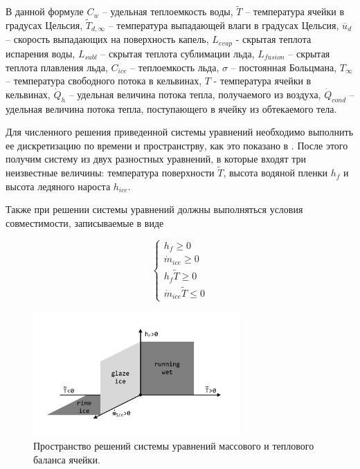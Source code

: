 \documentclass[
11pt,%
tightenlines,%
twoside,%
onecolumn,%
nofloats,%
nobibnotes,%
nofootinbib,%
superscriptaddress,%
noshowpacs,%
centertags]%
{revtex4}
\begin{document}
В данной формуле $C_w$ -- удельная теплоемкость воды, $\tilde{T}$ -- температура ячейки в градусах Цельсия, $\tilde{T}_{d,\infty}$ -- температура выпадающей влаги в градусах Цельсия, $\overline{u}_d$ -- скорость выпадающих на поверхность капель, $L_{evap}$ - скрытая теплота испарения воды, $L_{subl}$ -- скрытая теплота сублимации льда, $L_{fusion}$ -- скрытая теплота плавления льда, $C_{ice}$ -- теплоемкость льда, $\sigma$ -- постоянная Больцмана, $T_{\infty}$ -- температура свободного потока в кельвинах, $T$ - температура ячейки в кельвинах, $\dot Q_h$ -- удельная величина потока тепла, получаемого из воздуха, $\dot Q_{cond}$ -- удельная величина потока тепла, поступающего в ячейку из обтекаемого тела.

Для численного решения приведенной системы уравнений необходимо выполнить ее дискретизацию по времени и пространстрву, как это показано в \cite{Beaugendre}.
После этого получим систему из двух разностных уравнений, в которые входят три неизвестные величины: температура поверхности $\tilde{T}$, высота водяной пленки $h_f$ и высота ледяного нароста $h_{ice}$.  

Также при решении системы уравнений должны выполняться условия совместимости, записываемые в виде

\begin{equation}
\begin{cases}
h_f \ge 0\\
\dot m_{ice} \ge 0\\
h_f \tilde{T} \ge 0\\
\dot m_{ice} \tilde{T} \le 0
\end{cases}
\end{equation}

\begin{figure}[h]
\setcaptionmargin{5mm}
\onelinecaptionstrue
\includegraphics[width=0.7\textwidth]{pics/surface.pdf}
\caption{Пространство решений системы уравнений массового и теплового баланса ячейки.}\label{fig:surface}
\end{figure}
\end{document}
